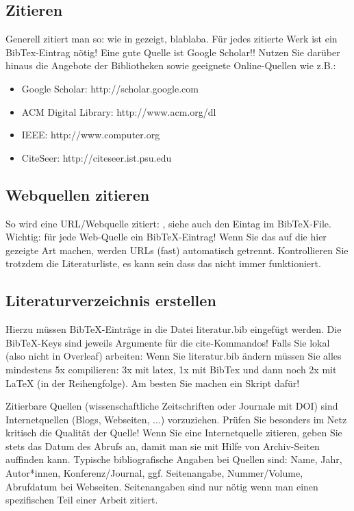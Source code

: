 \documentclass[12pt,oneside]{article}
\begin{document}
\subsection{Zitieren}\label{sec:zitate}
Generell zitiert man so: wie in \cite{clemen1989combining} gezeigt, blablaba. Für jedes zitierte Werk ist ein BibTex-Eintrag nötig! Eine gute Quelle ist Google Scholar!!
Nutzen Sie darüber hinaus die Angebote der Bibliotheken sowie geeignete Online-Quellen wie z.B.:
\begin{itemize}
\item Google Scholar: http://scholar.google.com
\item ACM Digital Library: http://www.acm.org/dl
\item IEEE: http://www.computer.org
\item  CiteSeer: http://citeseer.ist.psu.edu
\end{itemize}

\subsection{Webquellen zitieren}\label{sec:webquellen}
So wird eine URL/Webquelle zitiert: \cite{shiny1}, siehe auch den Eintag im BibTeX-File.
Wichtig: für jede Web-Quelle ein BibTeX-Eintrag! Wenn Sie das auf die hier gezeigte Art machen, werden URLs (fast) automatisch getrennt. Kontrollieren Sie trotzdem die Literaturliste, es kann sein dass das nicht immer funktioniert.

\subsection{Literaturverzeichnis erstellen}
Hierzu müssen BibTeX-Einträge in die Datei literatur.bib eingefügt werden. Die BibTeX-Keys sind jeweils Argumente für die cite-Kommandos! Falls Sie lokal (also nicht in Overleaf) arbeiten: Wenn Sie literatur.bib ändern müssen Sie alles mindestens 5x compilieren: 3x mit latex, 1x mit BibTex und dann noch 2x mit LaTeX (in der Reihengfolge). Am besten Sie machen ein Skript dafür!

Zitierbare Quellen (wissenschaftliche Zeitschriften oder Journale mit DOI) sind Internetquellen (Blogs, Webseiten, ...) vorzuziehen. Prüfen Sie besonders im Netz kritisch die Qualität der Quelle! Wenn Sie eine Internetquelle zitieren, geben Sie stets das Datum des Abrufs an, damit man sie mit Hilfe von Archiv-Seiten auffinden kann. Typische bibliografische Angaben bei Quellen sind: 
Name, Jahr, Autor*innen, Konferenz/Journal, ggf. Seitenangabe, Nummer/Volume, Abrufdatum bei Webseiten. Seitenangaben sind nur nötig wenn man einen spezifischen Teil einer Arbeit zitiert.
\end{document}
